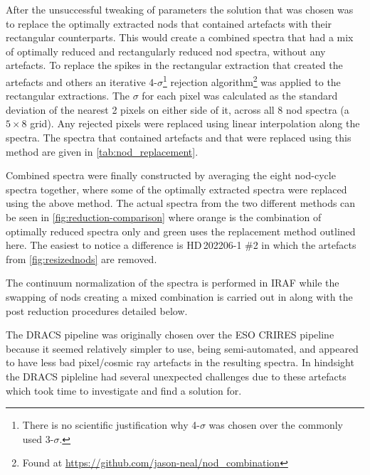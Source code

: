 After the unsuccessful tweaking of parameters the solution that was chosen was to replace the optimally extracted nods that contained artefacts with their rectangular counterparts.
This would create a combined spectra that had a mix of optimally reduced and rectangularly reduced nod spectra, without any artefacts.
To replace the spikes in the rectangular extraction that created the artefacts and others an iterative 4-\(\sigma\)\footnote{There is no scientific justification why 4-\(\sigma\) was chosen over the commonly used 3-\(\sigma\).} rejection algorithm\footnote{Found at \url{https://github.com/jason-neal/nod_combination}} was applied to the rectangular extractions.
The \(\sigma\) for each pixel was calculated as the standard deviation of the nearest 2 pixels on either side of it, across all 8 nod spectra (a $5\times8$ grid).
Any rejected pixels were replaced using linear interpolation along the spectra.
The spectra that contained artefacts and that were replaced using this method are given in \cref{tab:nod_replacement}.

Combined spectra were finally constructed by averaging the eight nod-cycle spectra together, where some of the optimally extracted spectra were replaced using the above method.
The actual spectra from the two different methods can be seen in \cref{fig:reduction-comparison} where orange is the combination of optimally reduced spectra only and green uses the replacement method outlined here.
The easiest to notice a difference is {HD\,202206-1 \#2} in which the artefacts from \cref{fig:resizednods} are removed.

The continuum normalization of the spectra is performed in {IRAF} while the swapping of nods creating a mixed combination is carried out in \Python{} along with the post reduction procedures detailed below.

The {DRACS} pipeline was originally chosen over the {ESO} {CRIRES} pipeline because it seemed relatively simpler to use, being semi-automated, and appeared to have less bad pixel/cosmic ray artefacts in the resulting spectra.
In hindsight the {DRACS} pipleline had several unexpected challenges due to these artefacts which took time to investigate and find a solution for.

